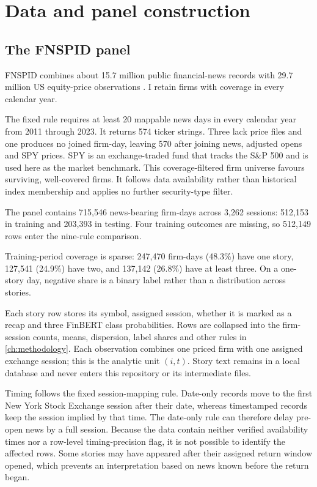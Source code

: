 \chapter{Data and panel construction}
\label{ch:data}

\section{The FNSPID panel}

FNSPID combines about 15.7 million public financial-news records with 29.7
million US equity-price observations \citep{dong2024}. I retain firms with
coverage in every calendar year.

The fixed rule requires at least 20 mappable news days in every calendar year
from 2011 through 2023. It returns 574 ticker strings. Three lack price files and
one produces no joined firm-day, leaving 570 after joining news, adjusted opens
and SPY prices. SPY is an exchange-traded fund that tracks the S\&P 500 and is
used here as the market benchmark. This coverage-filtered firm universe favours
surviving, well-covered firms. It follows data availability rather than
historical index membership and applies no further security-type filter.

The panel contains 715,546 news-bearing firm-days across 3,262 sessions:
512,153 in training and 203,393 in testing. Four training outcomes are missing,
so 512,149 rows enter the nine-rule comparison.

Training-period coverage is sparse: 247,470 firm-days (48.3\%) have one story,
127,541 (24.9\%) have two, and 137,142 (26.8\%) have at least three. On a
one-story day, negative share is a binary label rather than a distribution
across stories.

Each story row stores its symbol, assigned session, whether it is marked as a
recap and three FinBERT class probabilities. Rows are collapsed into the
firm-session counts, means,
dispersion, label shares and other rules in \cref{ch:methodology}. Each
observation combines one priced firm with one assigned exchange session; this is
the analytic unit $(i,t)$. Story text remains in a local database and never
enters this repository or its intermediate files.

Timing follows the fixed session-mapping rule. Date-only records move to the first
New York Stock Exchange session after their date, whereas timestamped records
keep the session implied by that time. The date-only rule can therefore delay pre-open
news by a full session. Because the data contain neither verified availability
times nor a row-level timing-precision flag, it is not possible to identify the
affected rows.
Some stories may have appeared after their assigned return window opened, which
prevents an interpretation based on news known before the return began.

